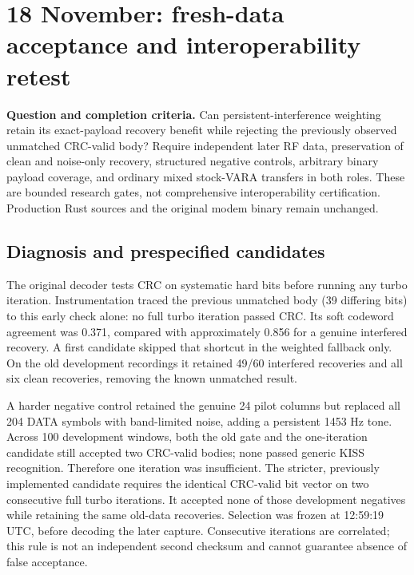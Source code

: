 \documentclass[11pt,a4paper]{article}
\begin{document}


\clearpage
\section{18 November: fresh-data acceptance and interoperability retest}
\label{sec:acceptance-retest}
\textbf{Question and completion criteria.} Can persistent-interference weighting
retain its exact-payload recovery benefit while rejecting the previously observed
unmatched CRC-valid body? Require independent later RF data, preservation of clean
and noise-only recovery, structured negative controls, arbitrary binary payload
coverage, and ordinary mixed stock-VARA transfers in both roles. These are bounded
research gates, not comprehensive interoperability certification. Production Rust
sources and the original modem binary remain unchanged.

\subsection{Diagnosis and prespecified candidates}
The original decoder tests CRC on systematic hard bits before running any turbo
iteration. Instrumentation traced the previous unmatched body (39 differing bits)
to this early check alone: no full turbo iteration passed CRC. Its soft codeword
agreement was 0.371, compared with approximately 0.856 for a genuine interfered
recovery. A first candidate skipped that shortcut in the weighted fallback only.
On the old development recordings it retained 49/60 interfered recoveries and all
six clean recoveries, removing the known unmatched result.

A harder negative control retained the genuine 24 pilot columns but replaced all
204 DATA symbols with band-limited noise, adding a persistent 1453 Hz tone. Across
100 development windows, both the old gate and the one-iteration candidate still
accepted two CRC-valid bodies; none passed generic KISS recognition. Therefore
one iteration was insufficient. The stricter, previously implemented candidate
requires the identical CRC-valid bit vector on two consecutive full turbo
iterations. It accepted none of those development negatives while retaining the
same old-data recoveries. Selection was frozen at 12:59:19 UTC, before decoding
the later capture. Consecutive iterations are correlated; this rule is not an
independent second checksum and cannot guarantee absence of false acceptance.
\end{document}
